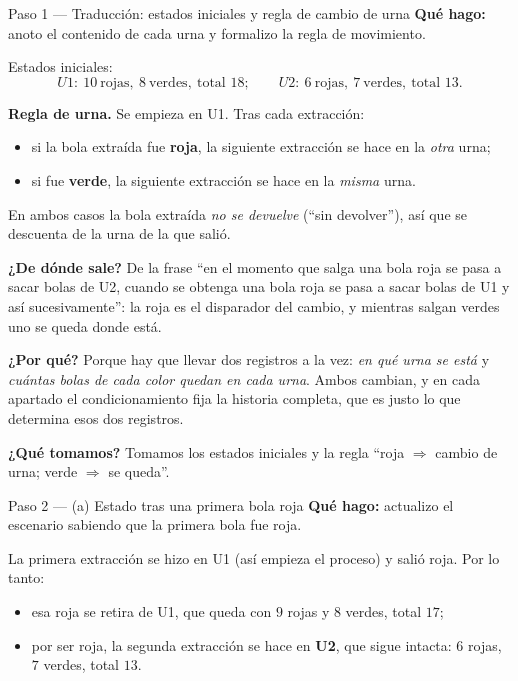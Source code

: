 \documentclass[11pt]{article}
\begin{document}
\begin{sol}

\begin{paso}{Paso 1 --- Traducci\'on: estados iniciales y regla de cambio de urna}
\textbf{Qu\'e hago:} anoto el contenido de cada urna y formalizo la regla de movimiento.

Estados iniciales:
\[
U1:\ 10\ \text{rojas},\ 8\ \text{verdes},\ \text{total } 18;
\qquad
U2:\ 6\ \text{rojas},\ 7\ \text{verdes},\ \text{total } 13 .
\]

\textbf{Regla de urna.} Se empieza en U1. Tras cada extracci\'on:
\begin{itemize}[leftmargin=*]
  \item si la bola extra\'ida fue \textbf{roja}, la siguiente extracci\'on se hace en la \emph{otra} urna;
  \item si fue \textbf{verde}, la siguiente extracci\'on se hace en la \emph{misma} urna.
\end{itemize}
En ambos casos la bola extra\'ida \emph{no se devuelve} (``sin devolver''), as\'i que se descuenta de la urna de la que sali\'o.

\textbf{¿De d\'onde sale?} De la frase ``en el momento que salga una bola roja se pasa a sacar bolas de U2, cuando se obtenga una bola roja se pasa a sacar bolas de U1 y as\'i sucesivamente'': la roja es el disparador del cambio, y mientras salgan verdes uno se queda donde est\'a.

\textbf{¿Por qu\'e?} Porque hay que llevar dos registros a la vez: \emph{en qu\'e urna se est\'a} y \emph{cu\'antas bolas de cada color quedan en cada urna}. Ambos cambian, y en cada apartado el condicionamiento fija la historia completa, que es justo lo que determina esos dos registros.

\textbf{¿Qu\'e tomamos?} Tomamos los estados iniciales y la regla ``roja $\Rightarrow$ cambio de urna; verde $\Rightarrow$ se queda''.
\end{paso}

\begin{paso}{Paso 2 --- (a) Estado tras una primera bola roja}
\textbf{Qu\'e hago:} actualizo el escenario sabiendo que la primera bola fue roja.

La primera extracci\'on se hizo en U1 (as\'i empieza el proceso) y sali\'o roja. Por lo tanto:
\begin{itemize}[leftmargin=*]
  \item esa roja se retira de U1, que queda con $9$ rojas y $8$ verdes, total $17$;
  \item por ser roja, la segunda extracci\'on se hace en \textbf{U2}, que sigue intacta: $6$ rojas, $7$ verdes, total $13$.
\end{itemize}


\end{paso}
\end{sol}
\end{document}

